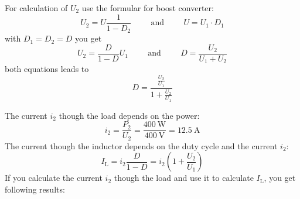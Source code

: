 \begin{solutionblock}
    For calculation of $U_\mathrm{2}$ use the formular for boost converter:
    \begin{equation}
        U_\mathrm{2}=U \frac{1}{1-D_\mathrm{2}} 
        \hspace{1cm} \mathrm{and} \hspace{1cm}  
        U=U_\mathrm{1} \cdot D_\mathrm{1}
    \end{equation}
    with $D_\mathrm{1}=D_\mathrm{2}=D$ you get
    \begin{equation}
        U_\mathrm{2}=\frac{D}{1-D} U_\mathrm{1}
        \hspace{1cm} \mathrm{and} \hspace{1cm}
        D=\frac{U_\mathrm{2}}{U_\mathrm{1}+U_\mathrm{2}}
    \end{equation}
    both equations leads to
    \begin{equation}
        D = \frac{\frac{U_\mathrm{2}}{U_\mathrm{1}}} {1+{\frac{U_\mathrm{2}}{U_\mathrm{1}}}}
    \end{equation}   
\end{solutionblock}

\begin{solutionblock}
    The current $i_\mathrm{2}$ though the load depends on the power:
    \begin{equation}
        i_\mathrm{2}=\frac{P_\mathrm{2}}{U_\mathrm{2}} = \frac{\SI{400}{\watt}}{\SI{400}{\volt}}=\SI{12.5}{\ampere}
    \end{equation}
    The current though the inductor depends on the duty cycle and the current $i_\mathrm{2}$:
    \begin{equation}
        I_\mathrm{L}=i_\mathrm{2} \frac{D}{1-D} = i_\mathrm{2} \left(1+\frac{U_\mathrm{2}}{U_\mathrm{1}} \right)
    \end{equation}
    If you calculate the current $i_\mathrm{2}$ though the load and use it to calculate $I_\mathrm{L}$, you get following results:

    
    
    

\end{solutionblock}
 

